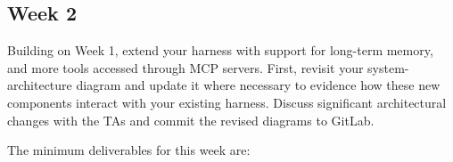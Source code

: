 \documentclass{article}
\begin{document}





\subsection{Week 2}

Building on Week 1, extend your harness with support for long-term memory, and more tools accessed through MCP servers. First, revisit your system-architecture diagram and update it where necessary to evidence how these new components interact with your existing harness. Discuss significant architectural changes with the TAs and commit the revised diagrams to GitLab.

The minimum deliverables for this week are:
\end{document}

